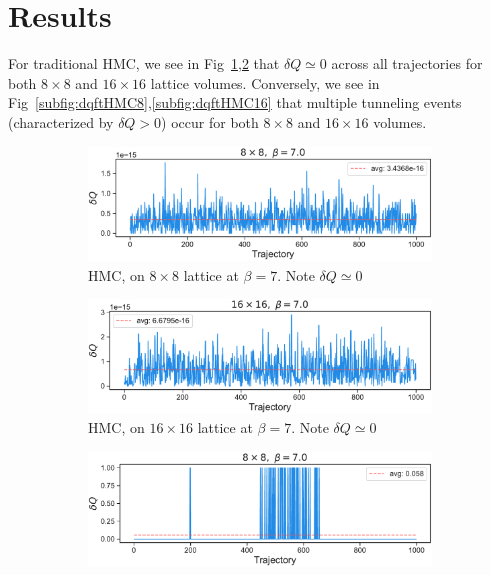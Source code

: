 \documentclass[a4paper,11pt]{article}
\begin{document}
\section{\label{sec:results}Results}
%
For traditional HMC, we see in Fig~\ref{subfig:dqHMC8},\ref{subfig:dqHMC16}
that \(\delta Q \simeq 0\) across all trajectories for both \(8\times 8\) and
\(16\times 16\) lattice volumes.
%
Conversely, we see in Fig~\ref{subfig:dqftHMC8},\ref{subfig:dqftHMC16} that
multiple tunneling events (characterized by \(\delta Q > 0\)) occur for both
\(8 \times 8\) and \(16 \times 16\) volumes.
\marginpar{\color{red}{Replace with \(Q\) vs traj}}
%
\begin{figure}[htpb]
    \centering
    \begin{subfigure}[b]{0.49\textwidth}
        \includegraphics[width=\textwidth]{assets/dqHMC_8x8_beta7.pdf}
        \caption{\label{subfig:dqHMC8}HMC, on \(8 \times 8\) lattice at
            \(\beta = 7\). Note \(\delta Q \simeq 0\)}
    \end{subfigure}
    \hfill
    \begin{subfigure}[b]{0.49\textwidth}
        \includegraphics[width=\textwidth]{assets/dqHMC_16x16_beta7.pdf}
        \caption{\label{subfig:dqHMC16}HMC, on \(16 \times 16\) lattice at
        \(\beta = 7\). Note \(\delta Q \simeq 0\)}
    \end{subfigure}
    \begin{subfigure}[b]{0.49\textwidth}
        \includegraphics[width=\textwidth]{assets/dqftHMC_8x8_beta7.pdf}

\end{subfigure}
\end{figure}
\end{document}
